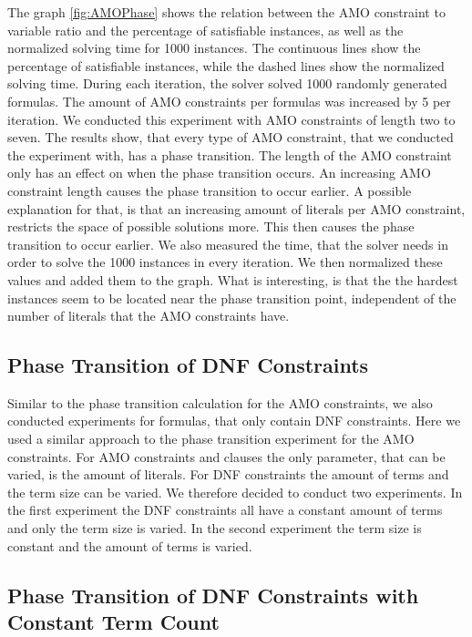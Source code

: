 The graph \ref{fig:AMOPhase} shows the relation between the AMO constraint to variable ratio and the percentage of satisfiable instances, as well as the normalized solving time for 1000 instances. The continuous lines show the percentage of satisfiable instances, while the dashed lines show the normalized solving time. During each iteration, the solver solved 1000 randomly generated formulas. The amount of AMO constraints per formulas was increased by 5 per iteration. We conducted this experiment with AMO constraints of length two to seven. The results show, that every type of AMO constraint, that we conducted the experiment with, has a phase transition. The length of the AMO constraint only has an effect on when the phase transition occurs. An increasing AMO constraint length causes the phase transition to occur earlier. A possible explanation for that, is that an increasing amount of literals per AMO constraint, restricts the space of possible solutions more. This then causes the phase transition to occur earlier. We also measured the time, that the solver needs in order to solve the 1000 instances in every iteration. We then normalized these values and added them to the graph. What is interesting, is that the the hardest instances seem to be located near the phase transition point, independent of the number of literals that the AMO constraints have.

\subsection{Phase Transition of DNF Constraints}

Similar to the phase transition calculation for the AMO constraints, we also conducted experiments for formulas, that only contain DNF constraints. Here we used a similar approach to the phase transition experiment for the AMO constraints. For AMO constraints and clauses the only parameter, that can be varied, is the amount of literals. For DNF constraints the amount of terms and the term size can be varied. We therefore decided to conduct two experiments. In the first experiment the DNF constraints all have a constant amount of terms and only the term size is varied. In the second experiment the term size is constant and the amount of terms is varied.

\newpage

\subsection{Phase Transition of DNF Constraints with Constant Term Count}

